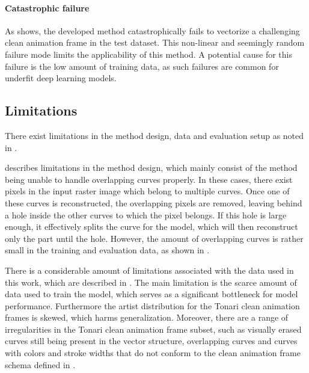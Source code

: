 \paragraph{Catastrophic failure}

As  shows, the developed method catastrophically fails to vectorize a challenging clean animation frame in the test dataset. This non-linear and seemingly random failure mode limits the applicability of this method. A potential cause for this failure is the low amount of training data, as such failures are common for underfit deep learning models.

\subsection{Limitations}

There exist limitations in the method design, data and evaluation setup as noted in .

 describes limitations in the method design, which mainly consist of the method being unable to handle overlapping curves properly. In these cases, there exist pixels in the input raster image which belong to multiple curves. Once one of these curves is reconstructed, the overlapping pixels are removed, leaving behind a hole inside the other curves to which the pixel belongs. If this hole is large enough, it effectively splits the curve for the model, which will then reconstruct only the part until the hole. However, the amount of overlapping curves is rather small in the training and evaluation data, as shown in .

There is a considerable amount of limitations associated with the data used in this work, which are described in . The main limitation is the scarce amount of data used to train the model, which serves as a significant bottleneck for model performance. Furthermore the artist distribution for the Tonari clean animation frames is skewed, which harms generalization. Moreover, there are a range of irregularities in the Tonari clean animation frame subset, such as visually erased curves still being present in the vector structure, overlapping curves and curves with colors and stroke widths that do not conform to the clean animation frame schema defined in .

